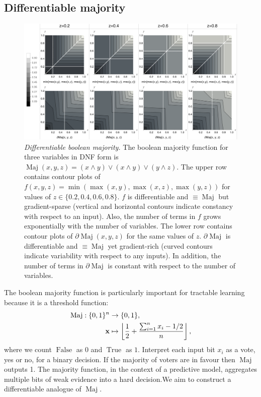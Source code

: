 \documentclass{article} %
\begin{document}
\subsection{Differentiable majority}

\begin{figure}[t]
	\centering
	\includegraphics[trim=0pt 0pt 0pt 0pt, clip, width=1.0\textwidth]{majority-gates.png}
	\caption{{\em Differentiable boolean majority.} The boolean majority function for three variables in DNF form is $\operatorname{Maj}(x,y,z) = (x \wedge y) \vee (x \wedge y) \vee (y \wedge z)$. The upper row contains contour plots of $f(x,y,z) = \operatorname{min}(\operatorname{max}(x,y), \operatorname{max}(x,z), \operatorname{max}(y,z))$ for values of $z \in \{0.2, 0.4, 0.6, 0.8\}$. $f$ is differentiable and $\equiv \operatorname{Maj}$ but gradient-sparse (vertical and horizontal contours indicate constancy with respect to an input). Also, the number of terms in $f$ grows exponentially with the number of variables. The lower row contains contour plots of $\partial\!\operatorname{Maj}(x,y,z)$ for the same values of $z$. $\partial\!\operatorname{Maj}$ is differentiable and $\equiv \operatorname{Maj}$ yet gradient-rich (curved contours indicate variability with respect to any inputs). In addition, the number of terms in $\partial\!\operatorname{Maj}$ is constant with respect to the number of variables.} 
	\label{fig:majority-plot}
\end{figure}

The boolean majority function is particularly important for tractable learning because it is a threshold function:
\begin{equation*}
\begin{aligned}
\operatorname{Maj}: \{0,1\}^{n} &\to \{0,1\},\\
{\bf x} &\mapsto \left\lfloor
\frac{1}{2} + \frac{\sum_{i=1}^{n} x_{i} - 1/2}{n}
\right\rfloor\text{,}
\end{aligned}
\end{equation*}
where we count $\operatorname{False}$ as $0$ and $\operatorname{True}$ as $1$. Interpret each input bit $x_{i}$ as a vote, yes or no, for a binary decision. If the majority of voters are in favour then $\operatorname{Maj}$ outputs 1. The majority function, in the context of a predictive model, aggregates multiple bits of weak evidence into a hard decision.We aim to construct a differentiable analogue of $\operatorname{Maj}$.
\end{document}
